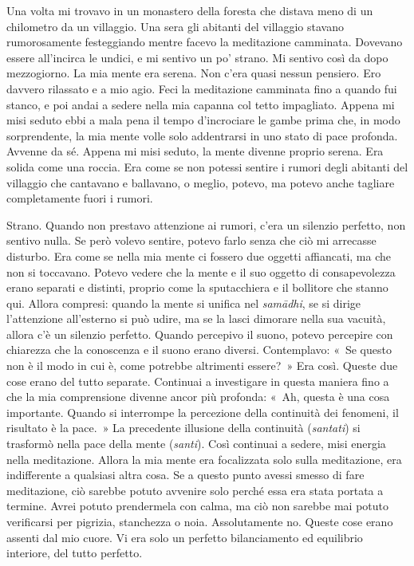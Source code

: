Una volta mi trovavo in un monastero della foresta che distava meno di
un chilometro da un villaggio. Una sera gli abitanti del villaggio
stavano rumorosamente festeggiando mentre facevo la meditazione
camminata. Dovevano essere all'incirca le undici, e mi sentivo un po'
strano. Mi sentivo così da dopo mezzogiorno. La mia mente era serena.
Non c'era quasi nessun pensiero. Ero davvero rilassato e a mio agio.
Feci la meditazione camminata fino a quando fui stanco, e poi andai a
sedere nella mia capanna col tetto impagliato. Appena mi misi seduto
ebbi a mala pena il tempo d'incrociare le gambe prima che, in modo
sorprendente, la mia mente volle solo addentrarsi in uno stato di pace
profonda. Avvenne da sé. Appena mi misi seduto, la mente divenne proprio
serena. Era solida come una roccia. Era come se non potessi sentire i
rumori degli abitanti del villaggio che cantavano e ballavano, o meglio,
potevo, ma potevo anche tagliare completamente fuori i rumori.

Strano. Quando non prestavo attenzione ai rumori, c'era un silenzio
perfetto, non sentivo nulla. Se però volevo sentire, potevo farlo senza
che ciò mi arrecasse disturbo. Era come se nella mia mente ci fossero
due oggetti affiancati, ma che non si toccavano. Potevo vedere che la
mente e il suo oggetto di consapevolezza erano separati e distinti,
proprio come la sputacchiera e il bollitore che stanno qui. Allora
compresi: quando la mente si unifica nel \emph{samādhi}, se si dirige
l'attenzione all'esterno si può udire, ma se la lasci dimorare nella sua
vacuità, allora c'è un silenzio perfetto. Quando percepivo il suono,
potevo percepire con chiarezza che la conoscenza e il suono erano
diversi. Contemplavo: «~Se questo non è il modo in cui è, come potrebbe
altrimenti essere?~» Era così. Queste due cose erano del tutto separate.
Continuai a investigare in questa maniera fino a che la mia comprensione
divenne ancor più profonda: «~Ah, questa è una cosa importante. Quando
si interrompe la percezione della continuità dei fenomeni, il risultato
è la pace.~» La precedente illusione della continuità (\emph{santati})
si trasformò nella pace della mente (\emph{santi}). Così continuai a
sedere, misi energia nella meditazione. Allora la mia mente era
focalizzata solo sulla meditazione, era indifferente a qualsiasi altra
cosa. Se a questo punto avessi smesso di fare meditazione, ciò sarebbe
potuto avvenire solo perché essa era stata portata a termine. Avrei
potuto prendermela con calma, ma ciò non sarebbe mai potuto verificarsi
per pigrizia, stanchezza o noia. Assolutamente no. Queste cose erano
assenti dal mio cuore. Vi era solo un perfetto bilanciamento ed
equilibrio interiore, del tutto perfetto.

